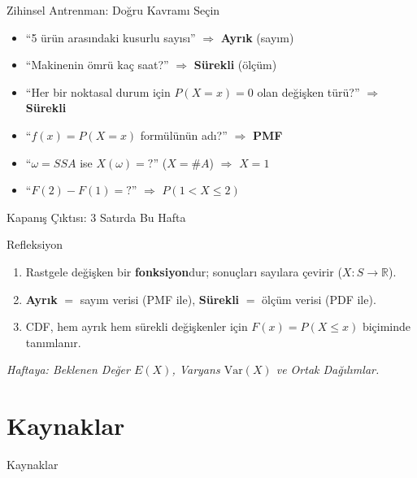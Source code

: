 \documentclass[light]{lutbeamer}
\begin{document}
\begin{frame}[fragile]{Zihinsel Antrenman: Doğru Kavramı Seçin}
    \begin{itemize}[<+->]
        \item ``5 ürün arasındaki kusurlu sayısı'' $\Rightarrow$ \textbf{Ayrık} (sayım)
        \item ``Makinenin ömrü kaç saat?'' $\Rightarrow$ \textbf{Sürekli} (ölçüm)
        \item ``Her bir noktasal durum için $P(X = x) = 0$ olan değişken türü?'' $\Rightarrow$ \textbf{Sürekli}
        \item ``$f(x) = P(X = x)$ formülünün adı?'' $\Rightarrow$ \textbf{PMF}
        \item ``$\omega = SSA$ ise $X(\omega) = ?$'' ($X = \#A$) $\Rightarrow$ $X = 1$
        \item ``$F(2) - F(1) = ?$'' $\Rightarrow$ $P(1 < X \le 2)$
    \end{itemize}
\end{frame}

\begin{frame}{Kapanış Çıktısı: 3 Satırda Bu Hafta}
    \begin{block}{Refleksiyon}
        \begin{enumerate}
            \item Rastgele değişken bir \textbf{fonksiyon}dur; sonuçları sayılara çevirir ($X: S \to \mathbb{R}$).
            \item \textbf{Ayrık} $=$ sayım verisi (PMF ile), \textbf{Sürekli} $=$ ölçüm verisi (PDF ile).
            \item CDF, hem ayrık hem sürekli değişkenler için $F(x) = P(X \le x)$ biçiminde tanımlanır.
        \end{enumerate}
    \end{block}

    \vspace{0.3cm}
    \centering
    \textit{Haftaya: Beklenen Değer $E(X)$, Varyans $\mathrm{Var}(X)$ ve Ortak Dağılımlar.}
\end{frame}

\section{Kaynaklar}
\begin{frame}[allowframebreaks]{Kaynaklar}
    \nocite{*}
    \printbibliography{}
\end{frame}
\end{document}
